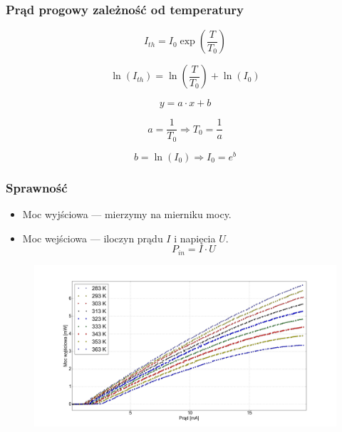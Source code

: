 \documentclass[xcolor={dvipsnames,table}]{beamer}
\begin{document}
\begin{frame}
\frametitle{Prąd progowy zależność od temperatury}

\begin{equation*}
I_{th} = I_0 \exp \left( \frac{T}{T_0} \right)
\end{equation*}

\begin{equation*}
\ln (I_{th}) =  \ln \left( \frac{T}{T_0} \right) + \ln(I_{0})
\end{equation*}

\begin{equation*}
y = a \cdot x + b
\end{equation*}

\begin{equation*}
a = \frac{1}{T_0} \Rightarrow T_0 = \frac{1}{a}
\end{equation*}

\begin{equation*}
b = \ln(I_0) \Rightarrow I_0 = e^b
\end{equation*}
\end{frame}

\begin{frame}
\frametitle{Sprawność}
\begin{itemize}
\item Moc wyjściowa  ---  mierzymy na mierniku mocy.
\item Moc wejściowa --- iloczyn prądu $I$ i napięcia $U$.
\begin{equation*}
P_{in} = I \cdot U
\end{equation*}
\end{itemize}
\end{frame}

\begin{frame}
\center
\begin{figure}
   \includegraphics[width=1.10\textwidth,natwidth=69,natheight=87]{plot_all.png}
\end{figure}

\end{frame}
\end{document}
